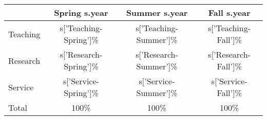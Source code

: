 \begin{center}
\begin{tabular}{lccc}
& Spring {{s.year}} & Summer {{s.year}} & Fall {{s.year}} \\
\hline
Teaching & {{s['Teaching-Spring']}}\% & {{s['Teaching-Summer']}}\% & {{s['Teaching-Fall']}}\% \\
Research & {{s['Research-Spring']}}\% & {{s['Research-Summer']}}\% & {{s['Research-Fall']}}\% \\
Service & {{s['Service-Spring']}}\% & {{s['Service-Summer']}}\% & {{s['Service-Fall']}}\%  \\
\hline
Total & 100\% & 100\% & 100\%
\end{tabular}
\end{center}